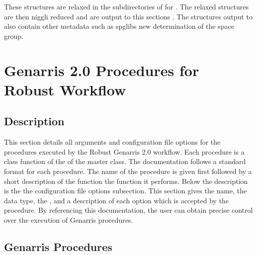 \documentclass[letterpaper,10pt,english]{sphinxmanual}
\begin{document}
These structures are relaxed in the subdirectories of  for
. The relaxed structures are then niggli reduced and are
output to this section\textquotesingle{}s . The structures output to 
also contain other metadata such as spglib\textquotesingle{}s new determination of the space
group.


\chapter{Genarris 2.0 Procedures for Robust Workflow}
\label{\detokenize{index:genarris-2-0-procedures-for-robust-workflow}}\label{\detokenize{index:documentation}}

\section{Description}
\label{\detokenize{index:description}}
This section details all arguments and configuration file
options for the procedures executed by the Robust Genarris 2.0 workflow. Each
procedure is a class function of the of the  master class.
The documentation follows a standard format for each procedure. The name
of the procedure is given first followed by a short description of the function
the function it performs. Below the description is the the configuration file
options subsection. This section gives the name, the data type,
the {\hyperref[\detokenize{index:category}]{}}, and a description of each option which is accepted by the
procedure. By referencing this documentation, the user can obtain precise
control over the execution of Genarris procedures.


\section{Genarris Procedures}
\label{\detokenize{index:genarris-procedures}}
\end{document}
